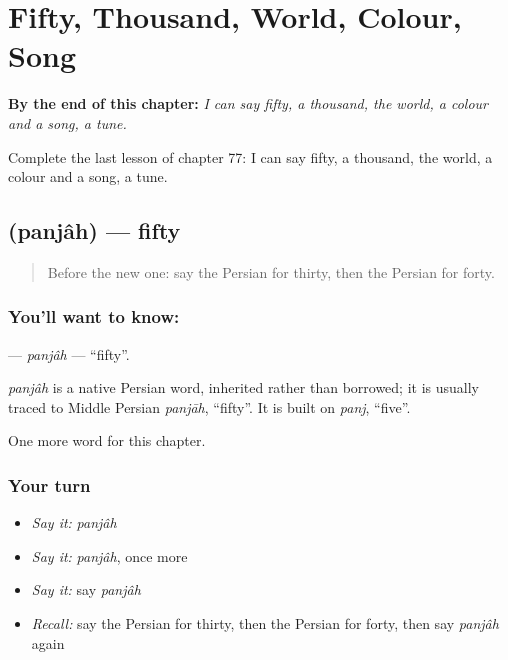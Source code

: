
\chapter{Fifty, Thousand, World, Colour, Song}
\label{ch:fa-fifty-thousand-world-colour-song}

\begin{chapteropening}
\textbf{By the end of this chapter:} \emph{I can say fifty, a thousand, the world, a colour and a song, a tune.}

Complete the last lesson of chapter 77: I can say fifty, a thousand, the world, a colour and a song, a tune.
\end{chapteropening}

\section[\texorpdfstring{\fa{پنجاه} (panjâh)}{پنجاه (panjâh)}]{ (panjâh) — fifty}

\label{lesson:FA-C77-panjah}



\begin{quote}
Before the new one: say the Persian for thirty, then the Persian for forty.
\end{quote}

\subsection*{You'll want to know: }
\textbf{} — \emph{panjâh} — \textquotedblleft{}fifty\textquotedblright{}.

\begin{cousinweb}
\emph{panjâh} is a native Persian word, inherited rather than borrowed; it is usually traced to Middle Persian \emph{panjāh}, \textquotedblleft{}fifty\textquotedblright{}. It is built on \emph{panj}, \textquotedblleft{}five\textquotedblright{}.
\end{cousinweb}

\begin{grammarlens}[title={What you've built}]
One more word for this chapter.
\end{grammarlens}

\subsection*{Your turn}
\begin{itemize}
\raggedright
  \item \emph{Say it:} \emph{panjâh}
  \item \emph{Say it:} \emph{panjâh}, once more
  \item \emph{Say it:} say \emph{panjâh}
  \item \emph{Recall:} say the Persian for thirty, then the Persian for forty, then say \emph{panjâh} again
\end{itemize}

